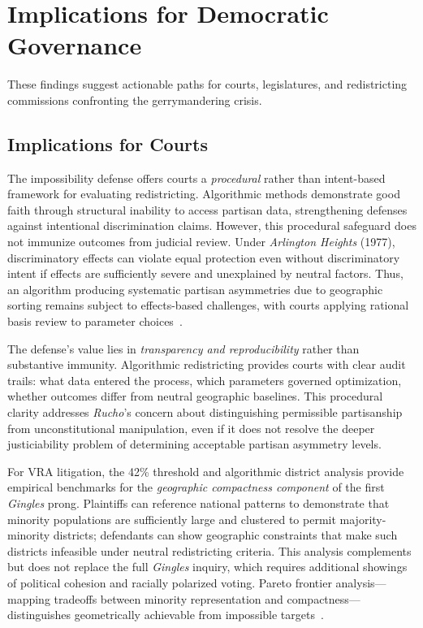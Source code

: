 \section{Implications for Democratic Governance}

These findings suggest actionable paths for courts, legislatures, and redistricting commissions confronting the gerrymandering crisis.

\subsection{Implications for Courts}

The impossibility defense offers courts a \emph{procedural} rather than intent-based framework for evaluating redistricting. Algorithmic methods demonstrate good faith through structural inability to access partisan data, strengthening defenses against intentional discrimination claims. However, this procedural safeguard does not immunize outcomes from judicial review. Under \emph{Arlington Heights} (1977), discriminatory effects can violate equal protection even without discriminatory intent if effects are sufficiently severe and unexplained by neutral factors. Thus, an algorithm producing systematic partisan asymmetries due to geographic sorting remains subject to effects-based challenges, with courts applying rational basis review to parameter choices~\cite{deluca2026edgeweighted}.

The defense's value lies in \emph{transparency and reproducibility} rather than substantive immunity. Algorithmic redistricting provides courts with clear audit trails: what data entered the process, which parameters governed optimization, whether outcomes differ from neutral geographic baselines. This procedural clarity addresses \emph{Rucho}'s concern about distinguishing permissible partisanship from unconstitutional manipulation, even if it does not resolve the deeper justiciability problem of determining acceptable partisan asymmetry levels.

For VRA litigation, the 42\% threshold and algorithmic district analysis provide empirical benchmarks for the \emph{geographic compactness component} of the first \emph{Gingles} prong. Plaintiffs can reference national patterns to demonstrate that minority populations are sufficiently large and clustered to permit majority-minority districts; defendants can show geographic constraints that make such districts infeasible under neutral redistricting criteria. This analysis complements but does not replace the full \emph{Gingles} inquiry, which requires additional showings of political cohesion and racially polarized voting. Pareto frontier analysis---mapping tradeoffs between minority representation and compactness---distinguishes geometrically achievable from impossible targets~\cite{deluca2026vra,deluca2026compactness}.

